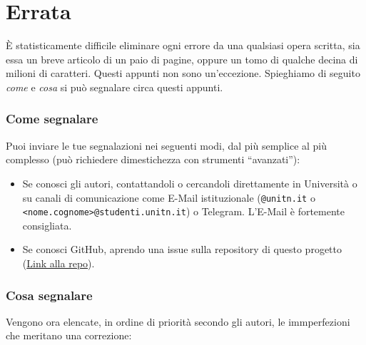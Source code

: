 \section*{Errata}
È statisticamente difficile eliminare ogni errore da una qualsiasi opera scritta, sia
essa un breve articolo di un paio di pagine, oppure un tomo di qualche decina di milioni
di caratteri. Questi appunti non sono un'eccezione.
Spieghiamo di seguito \textit{come} e \textit{cosa} si può segnalare circa questi appunti.

\subsubsection*{Come segnalare}
Puoi inviare le tue segnalazioni nei seguenti modi, dal più semplice al più complesso
(può richiedere dimestichezza con strumenti ``avanzati''):
\begin{itemize}
    \item Se conosci gli autori, contattandoli o cercandoli direttamente in Università
    o su canali di comunicazione come E-Mail istituzionale (\texttt{@unitn.it} o \texttt{<nome.cognome>@studenti.unitn.it})
    o Telegram. L'E-Mail è fortemente consigliata.

    \item Se conosci GitHub, aprendo una issue sulla repository di questo progetto (\href{https://github.com/zenosalty/courses-phy}{\faGithub \space Link alla repo}).

\end{itemize}

\subsubsection*{Cosa segnalare}
Vengono ora elencate, in ordine di priorità secondo gli autori, le immperfezioni che meritano una correzione:

